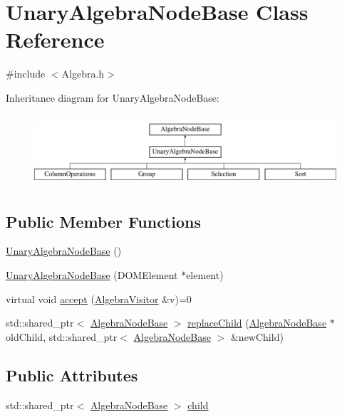 \hypertarget{class_unary_algebra_node_base}{\section{Unary\+Algebra\+Node\+Base Class Reference}
\label{class_unary_algebra_node_base}
}


{\ttfamily \#include $<$Algebra.\+h$>$}

Inheritance diagram for Unary\+Algebra\+Node\+Base\+:\begin{figure}[H]
\begin{center}
\leavevmode
\includegraphics[height=2.675159cm]{class_unary_algebra_node_base}
\end{center}
\end{figure}
\subsection*{Public Member Functions}
\begin{DoxyCompactItemize}
\item 
\hyperlink{class_unary_algebra_node_base_a61929152fac70f4ee299452bcae9ce7d}{Unary\+Algebra\+Node\+Base} ()
\item 
\hyperlink{class_unary_algebra_node_base_a557e3eb8be4cc10c3febe5c3d8918c86}{Unary\+Algebra\+Node\+Base} (D\+O\+M\+Element $\ast$element)
\item 
virtual void \hyperlink{class_unary_algebra_node_base_a33355111a226cb460c9a13efaf922e32}{accept} (\hyperlink{class_algebra_visitor}{Algebra\+Visitor} \&v)=0
\item 
std\+::shared\+\_\+ptr$<$ \hyperlink{class_algebra_node_base}{Algebra\+Node\+Base} $>$ \hyperlink{class_unary_algebra_node_base_a26aeeaeb45f97051d618cfcceccd5949}{replace\+Child} (\hyperlink{class_algebra_node_base}{Algebra\+Node\+Base} $\ast$old\+Child, std\+::shared\+\_\+ptr$<$ \hyperlink{class_algebra_node_base}{Algebra\+Node\+Base} $>$ \&new\+Child)
\end{DoxyCompactItemize}
\subsection*{Public Attributes}
\begin{DoxyCompactItemize}
\item 
std\+::shared\+\_\+ptr$<$ \hyperlink{class_algebra_node_base}{Algebra\+Node\+Base} $>$ \hyperlink{class_unary_algebra_node_base_a411f3922d4ab886c364e502f2370752e}{child}
\end{DoxyCompactItemize}



